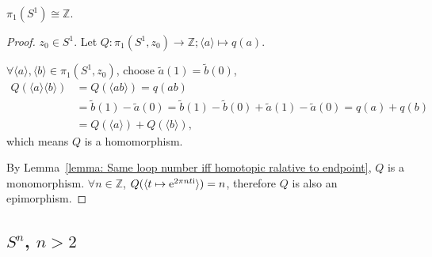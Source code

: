 \documentclass[openany, oneside, a5paper]{book}
\newcommand*{\pclass}[1]{\langle{#1}\rangle}    %
\begin{document}
\begin{theorem}\label{theorem: fundamental group of S^1 is Z}
    $\pi_1(S^1) \cong \mathbb Z$.
\end{theorem}
\begin{proof}
    $z_0 \in S^1$.
    Let $Q \colon \pi_1(S^1, z_0) \to \mathbb Z; \pclass{a} \mapsto q(a)$.

    $\forall \pclass{a}, \pclass{b} \in \pi_1(S^1, z_0)$, choose $\tilde a(1) = \tilde b(0)$,
    \begin{align}
        Q(\pclass{a} \pclass{b}) &= Q(\langle a b \rangle) 
        = q(ab) \\
        &= \tilde b(1) - \tilde a(0) = \tilde b(1) - \tilde b(0) + \tilde a(1) - \tilde a(0) = q(a) + q(b) \\
        &= Q(\pclass{a}) + Q(\pclass{b}),
    \end{align}
    which means $Q$ is a homomorphism. 

    By Lemma~\ref{lemma: Same loop number iff homotopic ralative to endpoint}, $Q$ is a monomorphism. 
    $\forall n \in \mathbb Z$, $Q(\langle t \mapsto \mathrm{e}^{2\pi n t\mathrm{i}}\rangle) = n$, therefore $Q$ is also an epimorphism.
\end{proof}

\subsection{\texorpdfstring{$S^n$, $n>2$}{Sn, n > 2}}
\end{document}
